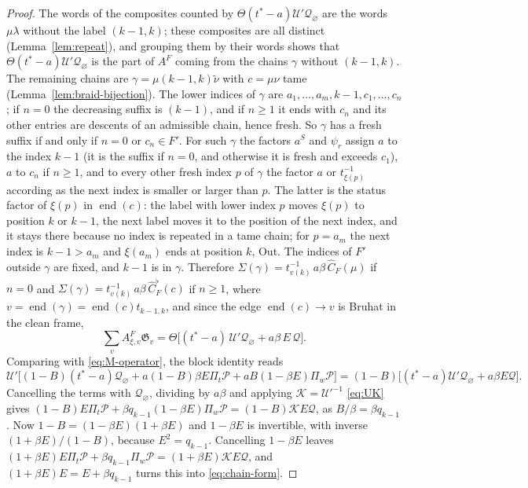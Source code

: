 \documentclass[11pt]{article}
\newcommand{\G}{\mathfrak{G}}
\begin{document}
\begin{proof}
The words of the composites counted by $\Theta(t^\ast-a)\mathcal U'\mathcal Q_\varnothing$
are the words $\mu\lambda$ without the label $(k-1,k)$; these
composites are all distinct (Lemma~\ref{lem:repeat}), and grouping them
by their words shows that $\Theta(t^\ast-a)\mathcal U'\mathcal Q_\varnothing$
is the part of $A^F$ coming from the chains $\gamma$ without
$(k-1,k)$. The remaining chains are $\gamma=\mu(k-1,k)\tilde\nu$ with
$c=\mu\nu$ tame (Lemma~\ref{lem:braid-bijection}). The lower indices
of $\gamma$ are $a_1,\ldots,a_m,k-1,c_1,\ldots,c_n$; if $n=0$ the
decreasing suffix is $(k-1)$, and if $n\geq1$ it ends with $c_n$ and
its other entries are descents of an admissible chain, hence fresh. So
$\gamma$ has a fresh suffix if and only if $n=0$ or $c_n\in F'$. For
such $\gamma$ the factors $a^S$ and $\psi_r$ assign $a$ to the index
$k-1$ (it is the suffix if $n=0$, and otherwise it is fresh and exceeds
$c_1$), $a$ to $c_n$ if $n\geq1$, and to every other fresh index $p$ of
$\gamma$ the factor $a$ or $t^{-1}_{\xi(p)}$ according as the next
index is smaller or larger than $p$. The latter is the status factor of
$\xi(p)$ in $\operatorname{end}(c)$: the label with lower index $p$
moves $\xi(p)$ to position $k$ or $k-1$, the next label moves it to
the position of the next index, and it stays there because no index is
repeated in a tame chain; for $p=a_m$ the next index is $k-1>a_m$ and
$\xi(a_m)$ ends at position $k$, Out. The indices of $F'$ outside
$\gamma$ are fixed, and $k-1$ is in $\gamma$. Therefore $\Sigma(\gamma)=t^{-1}_{v(k)}\,a\beta\,\widehat C_F(\mu)$
if $n=0$ and $\Sigma(\gamma)=t^{-1}_{v(k)}\,a\beta\,\widehat C^\flat_F(c)$
if $n\geq1$, where $v=\operatorname{end}(\gamma)=\operatorname{end}(c)t_{k-1,k}$,
and since the edge $\operatorname{end}(c)\to v$ is Bruhat in the clean
frame,
\[
 \sum_vA^F_{\xi,v}\G_v=\Theta\bigl[(t^\ast-a)\,\mathcal U'\mathcal Q_\varnothing+a\beta\,E\,\mathcal Q\bigr].
\]
Comparing with \eqref{eq:M-operator}, the block identity reads
\[
 \mathcal U'\bigl[(1-B)(t^\ast-a)\mathcal Q_\varnothing+a(1-B)\beta E\Pi_t\mathcal P+aB(1-\beta E)\Pi_w\mathcal P\bigr]
 =(1-B)\bigl[(t^\ast-a)\mathcal U'\mathcal Q_\varnothing+a\beta E\mathcal Q\bigr].
\]
Cancelling the terms with $\mathcal Q_\varnothing$, dividing by $a\beta$
and applying $\mathcal K=\mathcal U'^{-1}$ \eqref{eq:UK} gives
$(1-B)E\Pi_t\mathcal P+\beta q_{k-1}(1-\beta E)\Pi_w\mathcal P=(1-B)\mathcal KE\mathcal Q$,
as $B/\beta=\beta q_{k-1}$. Now $1-B=(1-\beta E)(1+\beta E)$ and
$1-\beta E$ is invertible, with inverse $(1+\beta E)/(1-B)$, because
$E^2=q_{k-1}$. Cancelling $1-\beta E$ leaves
$(1+\beta E)E\Pi_t\mathcal P+\beta q_{k-1}\Pi_w\mathcal P=(1+\beta E)\mathcal KE\mathcal Q$,
and $(1+\beta E)E=E+\beta q_{k-1}$ turns this into \eqref{eq:chain-form}.
\end{proof}
\end{document}

